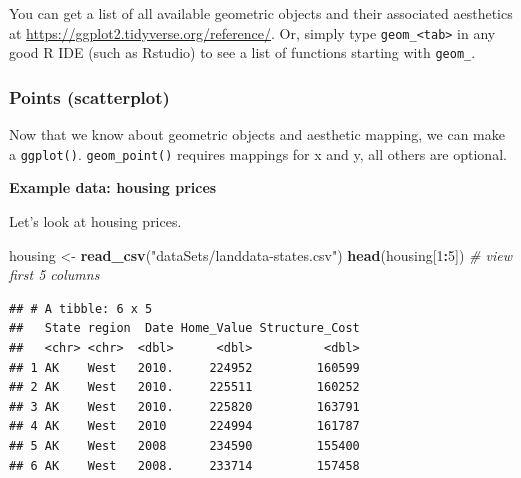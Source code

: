 \documentclass[]{book}
\newenvironment{Shaded}{\begin{snugshade}}{\end{snugshade}}
\newcommand{\CommentTok}[1]{\textcolor[rgb]{0.56,0.35,0.01}{\textit{#1}}}
\newcommand{\DecValTok}[1]{\textcolor[rgb]{0.00,0.00,0.81}{#1}}
\newcommand{\FloatTok}[1]{\textcolor[rgb]{0.00,0.00,0.81}{#1}}
\newcommand{\KeywordTok}[1]{\textcolor[rgb]{0.13,0.29,0.53}{\textbf{#1}}}
\newcommand{\NormalTok}[1]{#1}
\newcommand{\OperatorTok}[1]{\textcolor[rgb]{0.81,0.36,0.00}{\textbf{#1}}}
\newcommand{\StringTok}[1]{\textcolor[rgb]{0.31,0.60,0.02}{#1}}
\begin{document}
You can get a list of all available geometric objects and their associated aesthetics at \url{https://ggplot2.tidyverse.org/reference/}. Or, simply type \texttt{geom\_\textless{}tab\textgreater{}} in any good R IDE (such as Rstudio) to see a list of functions starting with \texttt{geom\_}.

\hypertarget{points-scatterplot}{%
\subsubsection{Points (scatterplot)}\label{points-scatterplot}}

Now that we know about geometric objects and aesthetic mapping, we can make a \texttt{ggplot()}. \texttt{geom\_point()} requires mappings for x and y, all others are optional.

\textbf{Example data: housing prices}

Let's look at housing prices.

\begin{Shaded}
\begin{Highlighting}[]
\NormalTok{housing <-}\StringTok{ }\KeywordTok{read_csv}\NormalTok{(}\StringTok{"dataSets/landdata-states.csv"}\NormalTok{)}
\KeywordTok{head}\NormalTok{(housing[}\DecValTok{1}\OperatorTok{:}\DecValTok{5}\NormalTok{]) }\CommentTok{# view first 5 columns}
\end{Highlighting}
\end{Shaded}

\begin{verbatim}
## # A tibble: 6 x 5
##   State region  Date Home_Value Structure_Cost
##   <chr> <chr>  <dbl>      <dbl>          <dbl>
## 1 AK    West   2010.     224952         160599
## 2 AK    West   2010.     225511         160252
## 3 AK    West   2010.     225820         163791
## 4 AK    West   2010      224994         161787
## 5 AK    West   2008      234590         155400
## 6 AK    West   2008.     233714         157458
\end{verbatim}

\begin{Shaded}
\end{Shaded}
\end{document}
